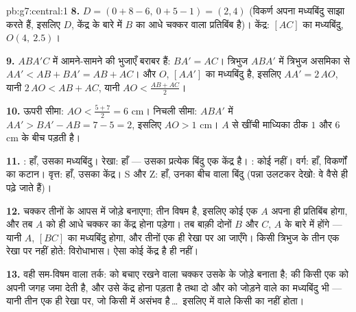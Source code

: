 \begin{solution}{pb:g7:central:1}
\textbf{8.} $D = (0 + 8 - 6,\ 0 + 5 - 1) = (2, 4)$ (विकर्ण अपना
मध्यबिंदु साझा करते हैं, इसलिए $D$, केंद्र के बारे में $B$ का आधे
चक्कर वाला प्रतिबिंब है)। केंद्र: $[AC]$ का मध्यबिंदु,
$O(4,\ 2.5)$।

\textbf{9.}  $ABA'C$ में आमने-सामने की भुजाएँ बराबर
हैं: $BA' = AC$। त्रिभुज $ABA'$ में त्रिभुज असमिका से
$AA' < AB + BA' = AB + AC$। और $O$, $[AA']$ का मध्यबिंदु है,
इसलिए $AA' = 2\,AO$, यानी $2\,AO < AB + AC$, यानी
$AO < \frac{AB + AC}{2}$।

\textbf{10.} ऊपरी सीमा: $AO < \frac{5 + 7}{2} = 6$ cm। निचली
सीमा: $ABA'$ में $AA' > BA' - AB = 7 - 5 = 2$, इसलिए
$AO > 1$ cm। $A$ से खींची माध्यिका ठीक $1$ और $6$ cm के बीच
पड़ती है।

\textbf{11.} : हाँ, उसका मध्यबिंदु। रेखा: हाँ --- उसका
प्रत्येक बिंदु एक केंद्र है। : कोई नहीं। वर्ग: हाँ,
विकर्णों का कटान। वृत्त: हाँ, उसका केंद्र। S और Z: हाँ, उनका बीच
वाला बिंदु (पन्ना उलटकर देखो: वे वैसे ही पढ़े जाते हैं)।

\textbf{12.}  चक्कर तीनों  के आपस में जोड़े बनाएगा; तीन
विषम है, इसलिए कोई एक  $A$ अपना ही प्रतिबिंब होगा, और तब $A$
को ही आधे चक्कर का केंद्र होना पड़ेगा। तब बाक़ी दोनों  $B$ और
$C$, $A$ के बारे में  होंगे --- यानी $A$, $[BC]$ का मध्यबिंदु
होगा, और तीनों  एक ही रेखा पर आ जाएँगे। किसी त्रिभुज के तीन
 एक रेखा पर नहीं होते: विरोधाभास। ऐसा कोई केंद्र है ही नहीं।

\textbf{13.} वही सम-विषम वाला तर्क:  को बचाए रखने वाला 
चक्कर उसके  के जोड़े बनाता है;  की  किसी
एक  को अपनी जगह जमा देती है, और उसे केंद्र होना पड़ता है तथा
दो और  को जोड़ने वाले  का मध्यबिंदु भी --- यानी तीन
 एक ही रेखा पर, जो किसी  में असंभव है\,\dots\ इसलिए  में  वाले किसी  का  नहीं होता।


\end{solution}
